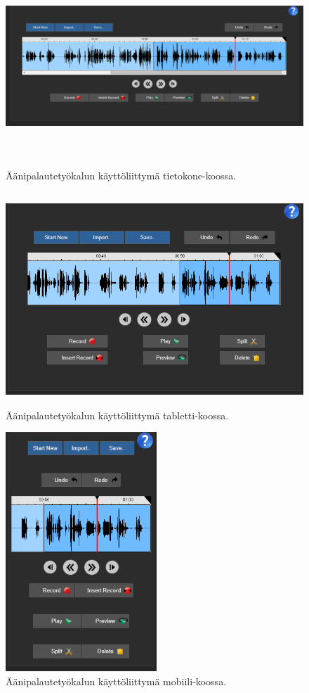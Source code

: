 \documentclass[utf8]{gradu3}
\begin{document}
\begin{figure}[H]\centering
  \begin{adjustwidth}{-2.2cm}{}
  \includegraphics[height=7.5cm,keepaspectratio]{UI}
  \caption{Äänipalautetyökalun käyttöliittymä tietokone-koossa.}
  \label{fig:UI}
  \end{adjustwidth}
\end{figure}

\begin{figure}[H]\centering
  \includegraphics[height=8cm,keepaspectratio]{UI_tablet}
  \caption{Äänipalautetyökalun käyttöliittymä tabletti-koossa.}
  \label{fig:UI_tablet}
\end{figure}

\begin{figure}[H]\centering
  \includegraphics[height=9cm,keepaspectratio]{UI_mobile}
  \caption{Äänipalautetyökalun käyttöliittymä mobiili-koossa.}
  \label{fig:UI_mobile}
\end{figure}
\end{document}
